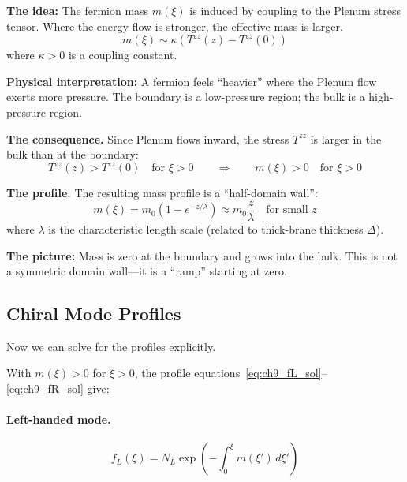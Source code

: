 \begin{tcolorbox}[colback=orange!5, colframe=orange!50!black,
    title=\textbf{Physical Hypothesis [P]}]
\textbf{The idea:} The fermion mass $m(\xi)$ is induced by coupling to the Plenum
stress tensor. Where the energy flow is stronger, the effective mass is larger.
\begin{equation}
    m(\xi) \sim \kappa \left( T^{zz}(z) - T^{zz}(0) \right)
    \label{eq:ch9_mass_from_stress}
\end{equation}
where $\kappa > 0$ is a coupling constant.

\textbf{Physical interpretation:} A fermion feels ``heavier'' where the Plenum
flow exerts more pressure. The boundary is a low-pressure region; the bulk
is a high-pressure region.
\end{tcolorbox}

\textbf{The consequence.} Since Plenum flows inward, the stress $T^{zz}$ is
larger in the bulk than at the boundary:
\begin{equation}
    T^{zz}(z) > T^{zz}(0) \quad \text{for } \xi > 0
    \qquad\Longrightarrow\qquad
    m(\xi) > 0 \quad \text{for } \xi > 0
    \label{eq:ch9_mass_positive}
\end{equation}

\textbf{The profile.} The resulting mass profile is a ``half-domain wall'':
\begin{equation}
    m(\xi) = m_0 \left(1 - e^{-z/\lambda}\right) \approx m_0 \frac{z}{\lambda}
    \quad \text{for small } z
    \label{eq:ch9_mass_profile}
\end{equation}
where $\lambda$ is the characteristic length scale (related to thick-brane
thickness $\Delta$).

\textbf{The picture:} Mass is zero at the boundary and grows into the bulk.
This is not a symmetric domain wall---it is a ``ramp'' starting at zero.

\subsection{Chiral Mode Profiles}

Now we can solve for the profiles explicitly.

With $m(\xi) > 0$ for $\xi > 0$, the profile equations~\eqref{eq:ch9_fL_sol}--\eqref{eq:ch9_fR_sol} give:

\paragraph{Left-handed mode.}
\begin{equation}
    f_L(\xi) = N_L \exp\left(-\int_0^\xi m(\xi') \, d\xi'\right)
    \label{eq:ch9_fL_profile}
\end{equation}

